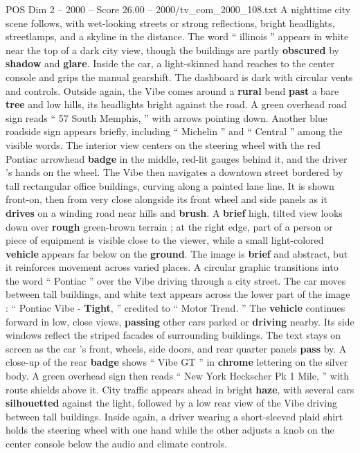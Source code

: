 \begin{textsample}{POS Dim 2 – 2000 – Score 26.00 – 2000/tv\_com\_2000\_108.txt}
A nighttime city scene follows, with wet-looking streets or strong reflections, bright headlights, streetlamps, and a skyline in the distance.
The word “ illinois ” appears in white near the top of a dark city view, though the buildings are partly \textbf{obscured} by \textbf{shadow} and \textbf{glare}.
Inside the car, a light-skinned hand reaches to the center console and grips the manual gearshift.
The dashboard is dark with circular vents and controls.
Outside again, the Vibe comes around a \textbf{rural} bend \textbf{past} a bare \textbf{tree} and low hills, its headlights bright against the road.
A green overhead road sign reads “ 57 South Memphis, ” with arrows pointing down.
Another blue roadside sign appears briefly, including “ Michelin ” and “ Central ” among the visible words.
The interior view centers on the steering wheel with the red Pontiac arrowhead \textbf{badge} in the middle, red-lit gauges behind it, and the driver ’s hands on the wheel.
The Vibe then navigates a downtown street bordered by tall rectangular office buildings, curving along a painted lane line.
It is shown front-on, then from very close alongside its front wheel and side panels as it \textbf{drives} on a winding road near hills and \textbf{brush}.
A \textbf{brief} high, tilted view looks down over \textbf{rough} green-brown terrain ; at the right edge, part of a person or piece of equipment is visible close to the viewer, while a small light-colored \textbf{vehicle} appears far below on the \textbf{ground}.
The image is \textbf{brief} and abstract, but it reinforces movement across varied places.
A circular graphic transitions into the word “ Pontiac ” over the Vibe driving through a city street.
The car moves between tall buildings, and white text appears across the lower part of the image : “ Pontiac Vibe - \textbf{Tight}, ” credited to “ Motor Trend. ” The \textbf{vehicle} continues forward in low, close views, \textbf{passing} other cars parked or \textbf{driving} nearby.
Its side windows reflect the striped facades of surrounding buildings.
The text stays on screen as the car ’s front, wheels, side doors, and rear quarter panels \textbf{pass} by.
A close-up of the rear \textbf{badge} shows “ Vibe GT ” in \textbf{chrome} lettering on the silver body.
A green overhead sign then reads “ New York Heckscher Pk 1 Mile, ” with route shields above it.
City traffic appears ahead in bright \textbf{haze}, with several cars \textbf{silhouetted} against the light, followed by a low rear view of the Vibe driving between tall buildings.
Inside again, a driver wearing a short-sleeved plaid shirt holds the steering wheel with one hand while the other adjusts a knob on the center console below the audio and climate controls.

\end{textsample}
